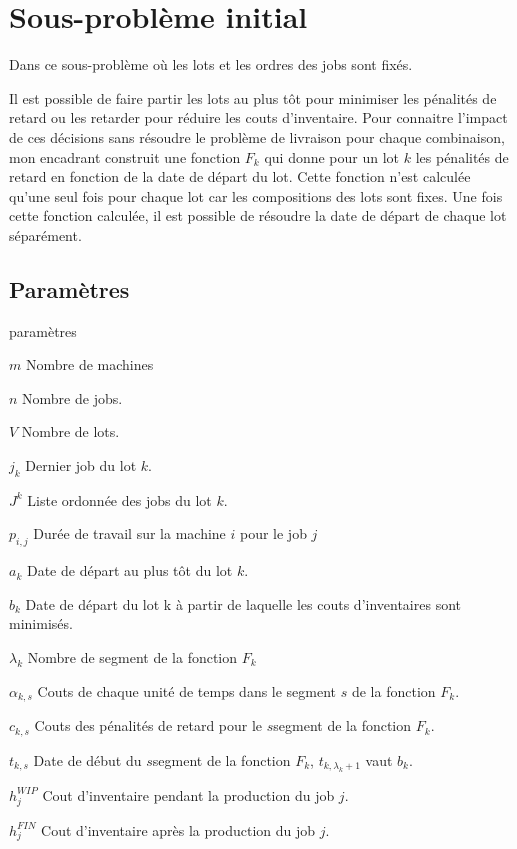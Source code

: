 \chapter{Sous-problème initial}

\label{appendix:modelisation_initiale}

Dans ce sous-problème où les lots et les ordres des jobs sont fixés.

Il est possible de faire partir les lots au plus tôt pour minimiser les pénalités de retard ou les retarder pour réduire les couts d'inventaire.
Pour connaitre l'impact de ces décisions sans résoudre le problème de livraison pour chaque combinaison,
mon encadrant construit une fonction $F_k$ qui donne pour un lot $k$ les pénalités de retard en fonction de la date de départ du lot.
Cette fonction n'est calculée qu'une seul fois pour chaque lot car les compositions des lots sont fixes.
Une fois cette fonction calculée, il est possible de résoudre la date de départ de chaque lot séparément.

\section{Paramètres}
\begin{labeling}{paramètres}
	\item [$m$]
	Nombre de machines
	\item [$n$]
	Nombre de jobs.
	\item [$V$]
	Nombre de lots.
	\item [$j_k$]
	Dernier job du lot $k$.
	\item [$J^k$] 
	Liste ordonnée des jobs du lot $k$.
	\item [$p_{i, j}$]
	Durée de travail sur la machine $i$ pour le job $j$
	\item [$a_k$]
	Date de départ au plus tôt du lot $k$.
	\item [$b_k$]
	Date de départ du lot k à partir de laquelle les couts d'inventaires sont minimisés.
	\item [$\lambda_k$]
	Nombre de segment de la fonction $F_k$
	\item [$\alpha_{k, s}$]
	Couts de chaque unité de temps dans le segment $s$ de la fonction $F_k$.
	\item [$c_{k, s}$]
	Couts des pénalités de retard pour le $s$\ieme segment de la fonction $F_k$.
	\item [$t_{k, s}$]
	Date de début du $s$\ieme segment de la fonction $F_k$, $t_{k, \lambda_k+1}$ vaut $b_k$.
	\item [$h_{j}^{WIP}$] 
	Cout d'inventaire pendant la production du job $j$.
	\item [$h_{j}^{FIN}$] 
	Cout d'inventaire après la production du job $j$.
\end{labeling}


